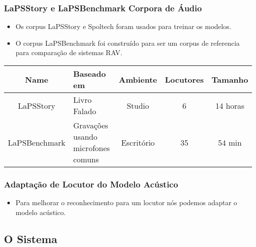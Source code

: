 \documentclass{beamer}
\begin{document}
\begin{frame}
   \frametitle{LaPSStory e LaPSBenchmark Corpora de Áudio}
   \begin{itemize}
      \item Os corpus LaPSStory e Spoltech foram usados para treinar os
	 modelos.
      \item O corpus LaPSBenchmark foi construído para ser um corpus de
	 referencia para comparação de sistemas RAV.\\[10pt]
   \end{itemize}
   {\footnotesize
   \centering
   \begin{tabular}{ c  p{2.5cm}  c  c  c }
      \toprule
      \textbf{Name} & \textbf{Baseado em} & \textbf{Ambiente} & \textbf{Locutores} & \textbf{Tamanho} \\\midrule
      LaPSStory     & Livro Falado        & Studio				  & 6 & 14 horas \\\midrule
      LaPSBenchmark & \scriptsize{Gravações usando microfones comuns} & Escritório & 35 & 54 min \\
      \bottomrule
   \end{tabular}}
\end{frame}

\begin{frame}
   \frametitle{Adaptação de Locutor do Modelo Acústico}
   \begin{itemize}
      \item Para melhorar o reconhecimento para um locutor
	 nós podemos adaptar o modelo acústico.
   \end{itemize}
\end{frame}

\subsection{O Sistema}

\end{document}
